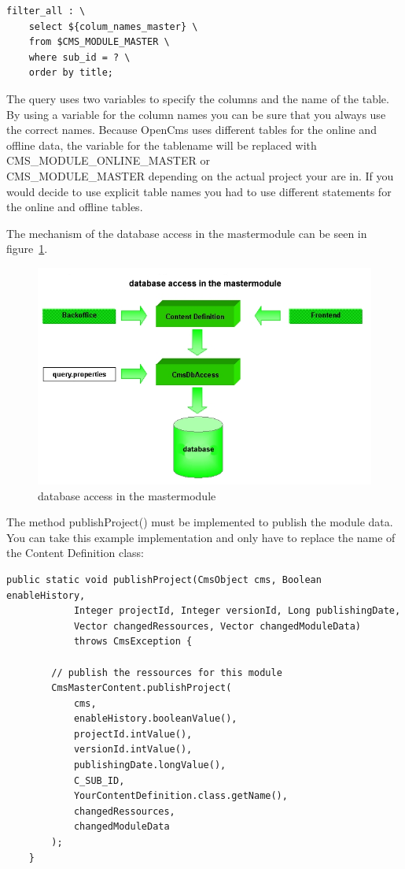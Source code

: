 \begin{verbatim}
filter_all : \
    select ${colum_names_master} \
    from $CMS_MODULE_MASTER \
    where sub_id = ? \
    order by title;
\end{verbatim}

The query uses two variables to specify the columns and the name of the table. 
By using a variable for the column names you can be sure that you always use the correct names.
Because OpenCms uses different tables for the online and offline data, the variable for the tablename
will be replaced with CMS\_MODULE\_ONLINE\_MASTER or \\
CMS\_MODULE\_MASTER depending on the actual project your are in.
If you would decide to use explicit table names you had to use different statements for the online and offline tables.

The mechanism of the database access in the mastermodule can be seen in figure~\ref{databasemaster}.

\begin{figure}[!hbt]
\begin{center}
\includegraphics[clip,width=\sgw]{pics/modules/masterclasses}
\end{center}
\caption[database access in the mastermodule]
    {database access in the mastermodule}
\label{databasemaster}
\end{figure}

The method {\meth publishProject()} must be implemented to publish the module data. You can take
this example implementation and only have to replace the name of the Content Definition class:

\begin{verbatim}
public static void publishProject(CmsObject cms, Boolean enableHistory,
            Integer projectId, Integer versionId, Long publishingDate,
            Vector changedRessources, Vector changedModuleData) 
            throws CmsException {

        // publish the ressources for this module
        CmsMasterContent.publishProject(
            cms, 
            enableHistory.booleanValue(),
            projectId.intValue(), 
            versionId.intValue(),
            publishingDate.longValue(), 
            C_SUB_ID, 
            YourContentDefinition.class.getName(),
            changedRessources, 
            changedModuleData
        );
    }
\end{verbatim}


